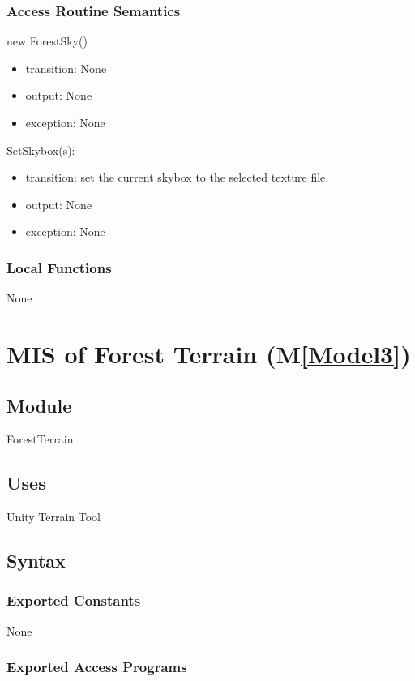 \documentclass[12pt, titlepage]{article}
\newcommand{\mref}[1]{M\ref{#1}}
\begin{document}
\subsubsection{Access Routine Semantics}
\noindent new ForestSky()
\begin{itemize}
\item transition: None
\item output: None
\item exception: None
\end{itemize}

\noindent SetSkybox(s):
\begin{itemize}
\item transition: set the current skybox to the selected texture file.
\item output: None
\item exception: None
\end{itemize}

\subsubsection{Local Functions}
None

\newpage

\section{MIS of Forest Terrain (\mref{Model3})} 
\subsection{Module}
ForestTerrain

\subsection{Uses}
Unity Terrain Tool

\subsection{Syntax}

\subsubsection{Exported Constants}
None
\subsubsection{Exported Access Programs}
\end{document}
